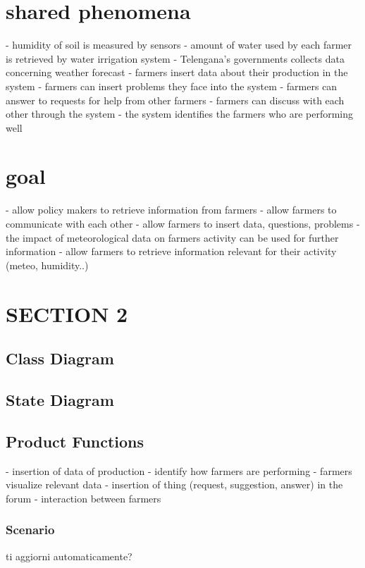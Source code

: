 \documentclass{article}
\begin{document}
\section{shared phenomena}
- humidity of soil is measured by sensors 
- amount of water used by each farmer is retrieved by water irrigation system
- Telengana's governments collects data concerning weather forecast
- farmers insert data about their production in the system
- farmers can insert problems they face into the system
- farmers can answer to requests for help from other farmers
- farmers can discuss with each other through the system
- the system identifies the farmers who are performing well


\section{goal}
- allow policy makers to retrieve information from farmers
- allow farmers to communicate with each other
- allow farmers to insert data, questions, problems
- the impact of meteorological data on farmers activity can be used for further information
- allow farmers to retrieve information relevant for their activity (meteo, humidity..)

\section{SECTION 2}
\subsection{Class Diagram}
\subsection{State Diagram}
\subsection{Product Functions}
- insertion of data of production
- identify how farmers are performing
- farmers visualize relevant data 
- insertion of thing (request, suggestion, answer) in the forum
- interaction between farmers

\subsubsection{Scenario}
ti aggiorni automaticamente?
\end{document}
